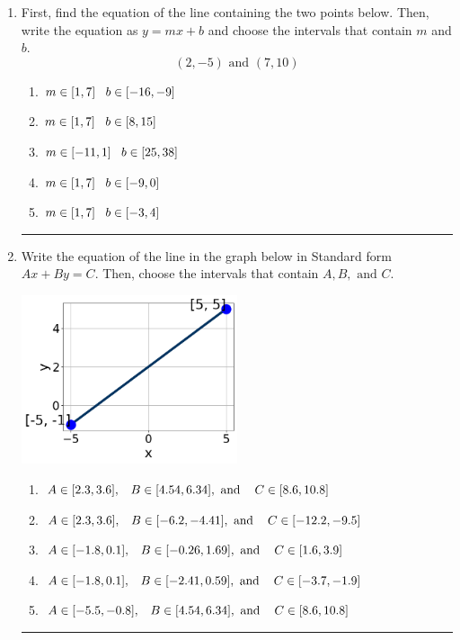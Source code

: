 \documentclass[14pt]{extbook}
\newcommand{\litem}[1]{\item#1\hspace*{-1cm}\rule{\textwidth}{0.4pt}}
\begin{document}
\begin{enumerate}
{\begin{enumerate}[label=\Alph*.]
\end{enumerate} }
\litem{
First, find the equation of the line containing the two points below. Then, write the equation as $ y=mx+b $ and choose the intervals that contain $m$ and $b$.\[ (2, -5) \text{ and } (7, 10) \]\begin{enumerate}[label=\Alph*.]
\item \( m \in [1, 7] \hspace*{3mm} b \in [-16, -9] \)
\item \( m \in [1, 7] \hspace*{3mm} b \in [8, 15] \)
\item \( m \in [-11, 1] \hspace*{3mm} b \in [25, 38] \)
\item \( m \in [1, 7] \hspace*{3mm} b \in [-9, 0] \)
\item \( m \in [1, 7] \hspace*{3mm} b \in [-3, 4] \)

\end{enumerate} }
\litem{
Write the equation of the line in the graph below in Standard form $Ax+By=C$. Then, choose the intervals that contain $A, B, \text{ and } C$.
\begin{center}
    \includegraphics[width=0.5\textwidth]{../Figures/linearGraphToStandardCopyB.png}
\end{center}
\begin{enumerate}[label=\Alph*.]
\item \( A \in [2.3, 3.6], \hspace{3mm} B \in [4.54, 6.34], \text{ and } \hspace{3mm} C \in [8.6, 10.8] \)
\item \( A \in [2.3, 3.6], \hspace{3mm} B \in [-6.2, -4.41], \text{ and } \hspace{3mm} C \in [-12.2, -9.5] \)
\item \( A \in [-1.8, 0.1], \hspace{3mm} B \in [-0.26, 1.69], \text{ and } \hspace{3mm} C \in [1.6, 3.9] \)
\item \( A \in [-1.8, 0.1], \hspace{3mm} B \in [-2.41, 0.59], \text{ and } \hspace{3mm} C \in [-3.7, -1.9] \)
\item \( A \in [-5.5, -0.8], \hspace{3mm} B \in [4.54, 6.34], \text{ and } \hspace{3mm} C \in [8.6, 10.8] \)


\end{enumerate}}
\end{enumerate}
\end{document}

